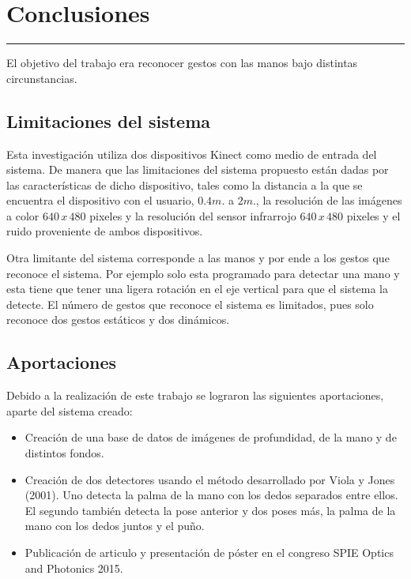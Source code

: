 \chapter{Conclusiones}\label{capit:cap6}
\vspace{-2.0325ex}%
\noindent
\rule{\textwidth}{0.5pt}
\vspace{-5.5ex}%
\newcommand{\pushline}{\Indp}%

El objetivo del trabajo era reconocer gestos con las manos bajo distintas circunstancias. 


\section{Limitaciones del sistema}

Esta investigación utiliza dos dispositivos Kinect como medio de entrada del sistema. De  manera que las limitaciones del sistema propuesto están dadas por las características de dicho dispositivo, tales como la distancia a la que se encuentra el dispositivo con el usuario, $0.4m.$ a $2m.$, la resolución de las imágenes a color $640 \, x \, 480$ pixeles y la resolución del sensor infrarrojo $640 \, x \, 480$ pixeles y el ruido proveniente de ambos dispositivos.

Otra limitante del sistema corresponde a las manos y por ende a los gestos que reconoce el sistema. Por ejemplo solo esta programado para detectar una mano y esta tiene que tener una ligera rotación en el eje vertical para que el sistema la detecte. El número de gestos que reconoce el sistema es limitados, pues solo reconoce dos gestos estáticos y dos dinámicos. 


\section{Aportaciones}  

Debido a la realización de este trabajo se lograron las siguientes aportaciones, aparte del sistema creado: 
 
\begin{itemize}
\item Creación de una base de datos de imágenes de profundidad, de la mano y de distintos fondos.   

\item Creación de dos detectores usando el método desarrollado por Viola y Jones (2001). Uno detecta la palma de la mano con los dedos separados entre ellos. El segundo también detecta la pose anterior y dos poses más, la palma de la mano con los dedos juntos y el puño. 

\item Publicación de articulo y presentación de póster en el congreso SPIE Optics and Photonics 2015.     

\end{itemize}


